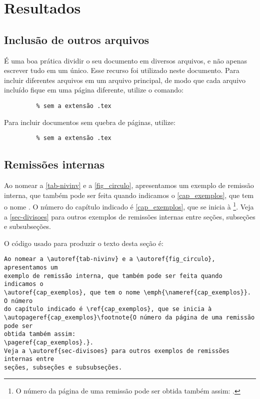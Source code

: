\chapter{Resultados}
\section{Inclusão de outros arquivos}\label{sec-include}

É uma boa prática dividir o seu documento em diversos arquivos, e não
apenas escrever tudo em um único. Esse recurso foi utilizado neste
documento. Para incluir diferentes arquivos em um arquivo principal,
de modo que cada arquivo incluído fique em uma página diferente, utilize o
comando:

\begin{verbatim}
         % sem a extensão .tex
\end{verbatim}

Para incluir documentos sem quebra de páginas, utilize:

\begin{verbatim}
         % sem a extensão .tex
\end{verbatim}


\section{Remissões internas}

Ao nomear a \autoref{tab-nivinv} e a \autoref{fig_circulo}, apresentamos um
exemplo de remissão interna, que também pode ser feita quando indicamos o
\autoref{cap_exemplos}, que tem o nome \emph{}. O número
do capítulo indicado é \ref{cap_exemplos}, que se inicia à
\footnote{O número da página de uma remissão pode ser
obtida também assim:
\pageref{cap_exemplos}.}.
Veja a \autoref{sec-divisoes} para outros exemplos de remissões internas entre
seções, subseções e subsubseções.

O código usado para produzir o texto desta seção é:

\begin{verbatim}
Ao nomear a \autoref{tab-nivinv} e a \autoref{fig_circulo}, apresentamos um
exemplo de remissão interna, que também pode ser feita quando indicamos o
\autoref{cap_exemplos}, que tem o nome \emph{\nameref{cap_exemplos}}. O número
do capítulo indicado é \ref{cap_exemplos}, que se inicia à
\autopageref{cap_exemplos}\footnote{O número da página de uma remissão pode ser
obtida também assim:
\pageref{cap_exemplos}.}.
Veja a \autoref{sec-divisoes} para outros exemplos de remissões internas entre
seções, subseções e subsubseções.
\end{verbatim}


